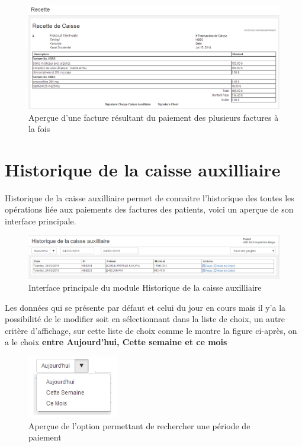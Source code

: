 \documentclass[12pt,a4paper]{report}
\begin{document}
\begin{figure}[h]
\begin{center}
\includegraphics[width=14cm]{pic/FactureDoubles.png}
\end{center}
\caption{Aperçue d'une facture résultant du paiement des plusieurs factures à la fois}
\label{Aperçue d'une facture résultant du paiement des plusieurs factures à la fois}
\end{figure}
\newpage
\section{Historique de la caisse auxilliaire}
Historique de la caisse auxilliaire permet de connaitre l'historique des toutes les opérations liée aux paiements des factures des patients, voici un aperçue de son interface principale.

\newpage
\begin{figure}[h]
\begin{center}
\includegraphics[width=14cm]{pic/HistCaAux.png}
\end{center}
\caption{Interface principale du module Historique de la caisse auxilliaire}
\label{Interface principale du module Historique de la caisse auxilliaire}
\end{figure}

Les données qui se présente par défaut et celui du jour en cours mais il y'a la possibilité de le modifier soit en sélectionnant dans la liste de choix, un autre critère d'affichage, sur cette liste de choix comme le montre la figure ci-après, on a le choix \textbf{entre Aujourd'hui, Cette semaine et ce mois} 


\begin{figure}[h]
\begin{center}
\includegraphics[width=4cm]{pic/SelectJour.png}
\end{center}
\caption{Aperçue de l'option permettant de rechercher une période de paiement}
\label{Aperçue de l'option permettant de rechercher une période de paiement}
\end{figure}
\end{document}
